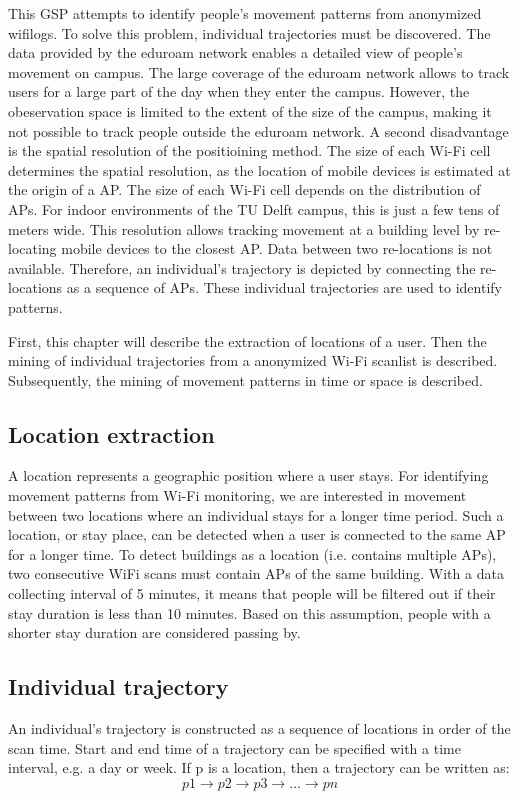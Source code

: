 This GSP attempts to identify people’s movement patterns from anonymized wifilogs. To solve this problem, individual trajectories must be discovered. The data provided by the eduroam network enables a detailed view of people’s movement on campus. The large coverage of the eduroam network allows to track users for a large part of the day when they enter the campus. However, the obeservation space is limited to the extent of the size of the campus, making it not possible to track people outside the eduroam network. A second disadvantage is the spatial resolution of the positioining method. The size of each Wi-Fi cell determines the spatial resolution, as the location of mobile devices is estimated at the origin of a AP. The size of each Wi-Fi cell depends on the distribution of APs. For indoor environments of the TU Delft campus, this is just a few tens of meters wide. This resolution allows tracking movement at a building level by re-locating mobile devices to the closest AP. Data between two re-locations is not available. Therefore, an individual’s trajectory is depicted by connecting the re-locations as a sequence of APs. These individual trajectories are used to identify patterns. 

First, this chapter will describe the extraction of locations of a user. Then the mining of individual trajectories from a anonymized Wi-Fi scanlist is described. Subsequently, the mining of movement patterns in time or space is described. 

\subsection{Location extraction}
A location represents a geographic position where a user stays. For identifying movement patterns from Wi-Fi monitoring, we are interested in movement between two locations where an individual stays for a longer time period. Such a location, or stay place, can be detected when a user is connected to the same AP for a longer time. To detect  buildings as a location (i.e. contains multiple APs), two consecutive WiFi scans must contain  APs of the same building. With a data collecting interval of 5 minutes, it means that people will be filtered out if their stay duration is less than 10 minutes. Based on this assumption, people with a shorter stay duration are considered passing by.

\subsection{Individual trajectory}
An individual’s trajectory is constructed as a sequence of locations in order of the scan time. Start and end time of a trajectory can be specified with a time interval, e.g. a day or week. If p is a location, then a trajectory can be written as:
$$p1 \rightarrow p2 \rightarrow p3 \rightarrow …\rightarrow pn$$

